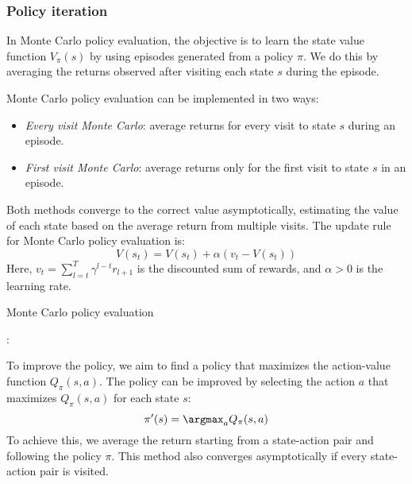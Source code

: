 \subsubsection{Policy iteration}
In Monte Carlo policy evaluation, the objective is to learn the state value function $V_{\pi}(s)$ by using episodes generated from a policy $\pi$. 
We do this by averaging the returns observed after visiting each state $s$ during the episode.

Monte Carlo policy evaluation can be implemented in two ways:
\begin{itemize}
    \item \textit{Every visit Monte Carlo}: average returns for every visit to state $s$ during an episode.
    \item \textit{First visit Monte Carlo}: average returns only for the first visit to state $s$ in an episode.
\end{itemize}
Both methods converge to the correct value asymptotically, estimating the value of each state based on the average return from multiple visits.
The update rule for Monte Carlo policy evaluation is:
\[V(s_t) = V(s_t)+\alpha(v_t-V(s_t))\]
Here, $v_t=\sum_{l=t}^T\gamma^{l-t}r_{l+1}$ is the discounted sum of rewards, and $\alpha>0$ is the learning rate.
\begin{algorithm}[H]
    \caption{Monte Carlo policy evaluation}
        \begin{algorithmic}[1]
            \Repeat 
                        : 
                        \EndIf
                    \EndFor
                \EndFor
        \end{algorithmic}
\end{algorithm}

To improve the policy, we aim to find a policy that maximizes the action-value function $Q_{\pi}(s,a)$. 
The policy can be improved by selecting the action $a$ that maximizes $Q_{\pi}(s,a)$ for each state $s$:
\[\pi^\prime(s)=\argmax_a Q_{\pi}(s,a)\]
To achieve this, we average the return starting from a state-action pair and following the policy $\pi$. 
This method also converges asymptotically if every state-action pair is visited.

